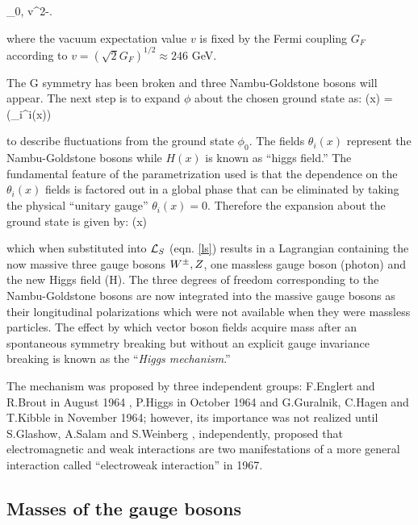 \beqn\label{field_exp}
\phi_0\equiv{}, \qquad v^2\equiv-.
\eeqn

\noindent where the vacuum expectation value $v$ is fixed by the Fermi coupling $G_F$ according to $v=(\sqrt{2}G_F)^{1/2}\approx 246$ GeV.

\noindent The G symmetry has been broken and three Nambu-Goldstone bosons will appear. The next step is to expand $\phi$ about the chosen ground state as:
\beqn
\phi(x) = \exp\left(\sigma_i\theta^i(x)\right) \approx {} 
\eeqn

\noindent to describe fluctuations from the ground state $\phi_0$. The fields $\theta_i(x)$ represent the Nambu-Goldstone bosons while $H(x)$ is known as ``higgs field.'' The fundamental feature of the parametrization used is that the dependence on the $\theta_i(x)$ fields is factored out in a global phase that can be eliminated by taking the physical ``unitary gauge'' $\theta_i(x)=0$. Therefore the expansion about the ground state is given by:
\beqn\label{higgs_dublet}
\phi(x)
\eeqn

\noindent which when substituted into $\mathcal{L}_S$ (eqn. \ref{ls}) results in a Lagrangian containing the now massive three gauge bosons $W^\pm, Z$, one massless gauge boson (photon) and the new Higgs field (H). The three degrees of freedom corresponding to the Nambu-Goldstone bosons are now integrated into the massive gauge bosons as their longitudinal polarizations which were not available when they were massless particles. The effect by which vector boson fields acquire mass after an spontaneous symmetry breaking but without an explicit gauge invariance breaking is known as the ``\textit{Higgs mechanism}.''

\noindent The mechanism was proposed by three independent groups: F.Englert and R.Brout in August 1964 \cite{englert}, P.Higgs in October 1964 \cite{higgs} and G.Guralnik, C.Hagen and T.Kibble in November 1964\cite{ghk}; however, its importance was not realized until S.Glashow\cite{glashow}, A.Salam\cite{salam} and S.Weinberg \cite{weinberg}, independently, proposed that electromagnetic and weak interactions are two manifestations of a more general interaction called ``electroweak interaction'' in 1967.

\subsection{Masses of the gauge bosons}

